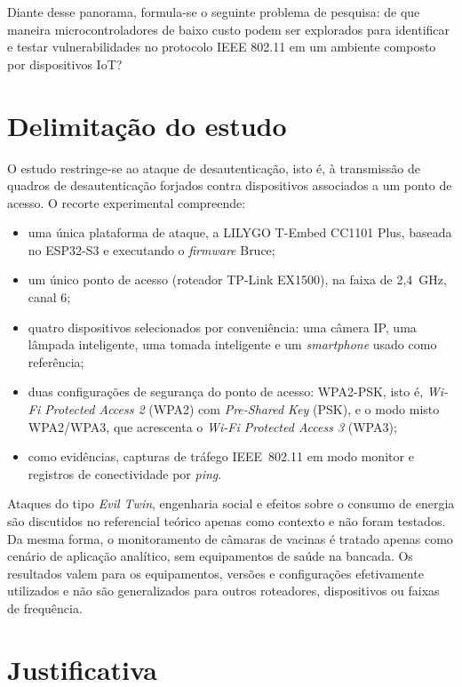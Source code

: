 Diante desse panorama, formula-se o seguinte problema de pesquisa: de que maneira microcontroladores de baixo custo podem ser explorados para identificar e testar vulnerabilidades no protocolo IEEE 802.11 em um ambiente composto por dispositivos IoT?

\section{Delimitação do estudo}
\label{sec:delimitacao}

O estudo restringe-se ao ataque de desautenticação, isto é, à transmissão de quadros de desautenticação forjados contra dispositivos associados a um ponto de acesso. O recorte experimental compreende:

\begin{itemize}
    \item uma única plataforma de ataque, a LILYGO T-Embed CC1101 Plus, baseada no ESP32-S3 e executando o \textit{firmware} Bruce;
    \item um único ponto de acesso (roteador TP-Link EX1500), na faixa de 2,4~GHz, canal 6;
    \item quatro dispositivos selecionados por conveniência: uma câmera IP, uma lâmpada inteligente, uma tomada inteligente e um \textit{smartphone} usado como referência;
    \item duas configurações de segurança do ponto de acesso: WPA2-PSK, isto é, \textit{Wi-Fi Protected Access 2} (WPA2) com \textit{Pre-Shared Key} (PSK), e o modo misto WPA2/WPA3, que acrescenta o \textit{Wi-Fi Protected Access 3} (WPA3);
    \item como evidências, capturas de tráfego IEEE~802.11 em modo monitor e registros de conectividade por \textit{ping}.
\end{itemize}

Ataques do tipo \textit{Evil Twin}, engenharia social e efeitos sobre o consumo de energia são discutidos no referencial teórico apenas como contexto e não foram testados. Da mesma forma, o monitoramento de câmaras de vacinas é tratado apenas como cenário de aplicação analítico, sem equipamentos de saúde na bancada. Os resultados valem para os equipamentos, versões e configurações efetivamente utilizados e não são generalizados para outros roteadores, dispositivos ou faixas de frequência.

\section{Justificativa}

